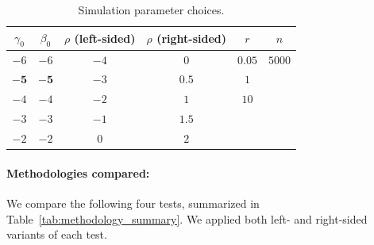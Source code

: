 \documentclass[12pt]{article}
\theoremstyle{definition}
\begin{document}
\begin{table}[!h]
  \centering
  \begin{tabular}{c|c|c|c|c|c}
  $\gamma_0$ & $\beta_0$ & $\rho$ (left-sided) & $\rho$ (right-sided) & $r$ & $n$ \\
  \hline
  $-6$ & $-6$ & $-4$ & $0$ & $0.05$ & $5000$ \\
  $\bm{-5}$ & $\bm{-5}$ & $-3$ & $0.5$ & $1$ & \\
  $-4$ & $-4$ & $-2$ & $1$ & $10$ & \\
  $-3$ & $-3$ & $-1$ & $1.5$ & & \\
  $-2$ & $-2$ & $0$ & $2$ & & \\
  \end{tabular}
\caption{Simulation parameter choices.}
\label{tab:simulation_parameter}
\end{table}

\paragraph{Methodologies compared:}

We compare the following four tests, summarized in Table~\ref{tab:methodology_summary}. We applied both left- and right-sided variants of each test.
\end{document}
